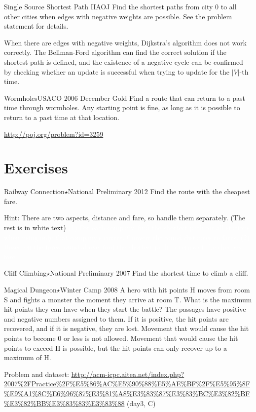 \begin{psbox}{Single Source Shortest Path II}{AOJ}
Find the shortest paths from city $0$ to all other cities when edges with negative weights are possible.
See the problem statement for details.

\end{psbox}

When there are edges with negative weights, Dijkstra's algorithm does not work correctly. The Bellman-Ford algorithm can find the correct solution if the shortest path is defined, and the existence of a negative cycle can be confirmed by checking whether an update is successful when trying to update for the $|V|$-th time.

\begin{pbox}{Wormholes}{USACO 2006 December Gold}
  Find a route that can return to a past time through wormholes. Any starting point is fine, as long as it is possible to return to a past time at that location.

\url{http://poj.org/problem?id=3259}
\end{pbox}
\section{Exercises}

\begin{pbox}{Railway Connection$\star$}{National Preliminary 2012}
Find the route with the cheapest fare.

\end{pbox}

Hint: There are two aspects, distance and fare, so handle them separately. (The rest is in white text)
\textcolor{white}{(1) For each company, find the shortest path for all stations when using only that company's routes. Convert the found distances to fares. (2) Based on the fares found above, find the shortest path in terms of the cheapest fare.}

\begin{pbox}{Cliff Climbing$\star$}{National Preliminary 2007}
Find the shortest time to climb a cliff.

\end{pbox}

\begin{pbox}{Magical Dungeon$\star$}{Winter Camp 2008}
A hero with hit points H moves from room S and fights a monster the moment they arrive at room T. What is the maximum hit points they can have when they start the battle?
The passages have positive and negative numbers assigned to them. If it is positive, the hit points are recovered, and if it is negative, they are lost. Movement that would cause the hit points to become 0 or less is not allowed. Movement that would cause the hit points to exceed H is possible, but the hit points can only recover up to a maximum of H.


Problem and dataset: \url{http://acm-icpc.aitea.net/index.php?2007\%2FPractice\%2F\%E5\%86\%AC\%E5\%90\%88\%E5\%AE\%BF\%2F\%E5\%95\%8F\%E9\%A1\%8C\%E6\%96\%87\%E3\%81\%A8\%E3\%83\%87\%E3\%83\%BC\%E3\%82\%BF\%E3\%82\%BB\%E3\%83\%83\%E3\%83\%88} (day3, C)
\end{pbox}


